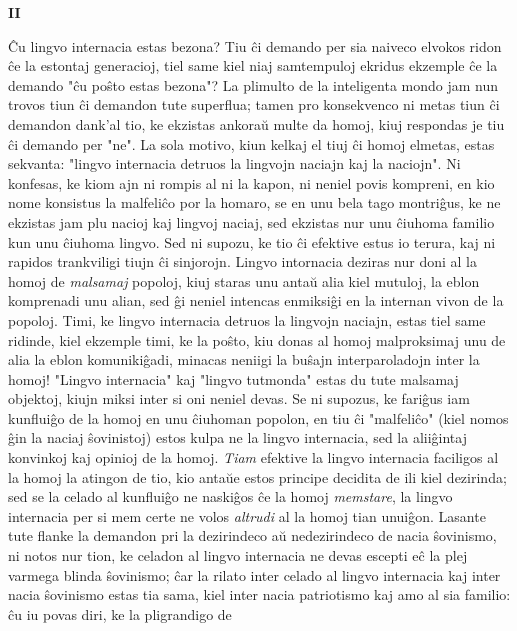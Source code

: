 \begin{center}
\textbf{II}
\end{center}

   \^Cu lingvo internacia estas bezona? Tiu \^ci demando per sia
naiveco elvokos ridon \^ce la estontaj generacioj, tiel same kiel
niaj samtempuloj ekridus ekzemple \^ce la demando "\^cu po\^sto
estas bezona"? La plimulto de la inteligenta mondo jam nun trovos
tiun \^ci demandon tute superflua; tamen pro konsekvenco ni metas
tiun \^ci demandon dank'al tio, ke ekzistas ankora\u u multe da
homoj, kiuj respondas je tiu \^ci demando per "ne". La sola
motivo, kiun kelkaj el tiuj \^ci homoj elmetas, estas sekvanta:
"lingvo internacia detruos la lingvojn naciajn kaj la naciojn". Ni
konfesas, ke kiom ajn ni rompis al ni la kapon, ni neniel povis
kompreni, en kio nome konsistus la malfeli\^co por la homaro, se en
unu bela tago montri\^gus, ke ne ekzistas jam plu nacioj kaj lingvoj
naciaj, sed ekzistas nur unu \^ciuhoma familio kun unu \^ciuhoma
lingvo. Sed ni supozu, ke tio \^ci efektive estus io terura, kaj ni
rapidos trankviligi tiujn \^ci sinjorojn. Lingvo intornacia deziras
nur doni al la homoj de {\sl malsamaj} popoloj, kiuj staras unu
anta\u u alia kiel mutuloj, la eblon komprenadi unu alian, sed \^gi
neniel intencas enmiksi\^gi en la internan vivon de la popoloj.
Timi, ke lingvo internacia detruos la lingvojn naciajn, estas tiel
same ridinde, kiel ekzemple timi, ke la po\^sto, kiu donas al homoj
malproksimaj unu de alia la eblon komuniki\^gadi, minacas neniigi la
bu\^sajn interparoladojn inter la homoj! "Lingvo internacia" kaj
"lingvo tutmonda" estas du tute malsamaj objektoj, kiujn miksi
inter si oni neniel devas. Se ni supozus, ke fari\^gus iam
kunflui\^go de la homoj en unu \^ciuhoman popolon, en tiu \^ci
"malfeli\^co" (kiel nomos \^gin la naciaj \^sovinistoj) estos
kulpa ne la lingvo internacia, sed la alii\^gintaj konvinkoj kaj
opinioj de la homoj. {\sl Tiam} efektive la lingvo internacia
faciligos al la homoj la atingon de tio, kio anta\u ue estos
principe decidita de ili kiel dezirinda; sed se la celado al
kunflui\^go ne naski\^gos \^ce la homoj {\sl memstare}, la lingvo
internacia per si mem certe ne volos {\sl altrudi} al la homoj tian
unui\^gon. Lasante tute flanke la demandon pri la dezirindeco a\u u
nedezirindeco de nacia \^sovinismo, ni notos nur tion, ke celadon al
lingvo internacia ne devas escepti e\^c la plej varmega blinda
\^sovinismo; \^car la rilato inter celado al lingvo internacia kaj
inter nacia \^sovinismo estas tia sama, kiel inter nacia patriotismo
kaj amo al sia familio: \^cu iu povas diri, ke la pligrandigo de
